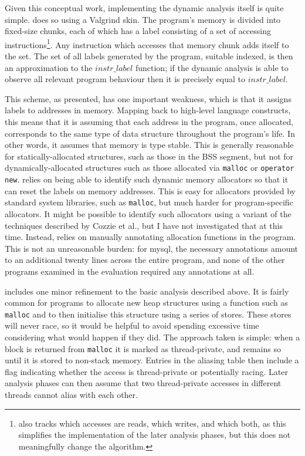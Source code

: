 Given this conceptual work, implementing the dynamic analysis itself
is quite simple.  {\Implementation} does so using a Valgrind skin.
The program's memory is divided into fixed-size chunks, each of which
has a label consisting of a set of accessing
instructions\footnote{{\Implementation} also tracks which accesses are
  reads, which writes, and which both, as this simplifies the
  implementation of the later analysis phases, but this does not
  meaningfully change the algorithm.}.  Any instruction which accesses
that memory chunk adds itself to the set.  The set of all labels
generated by the program, suitable indexed, is then an approximation
to the $\mathit{instr\_label}$ function; if the dynamic analysis is
able to observe all relevant program behaviour then it is precisely
equal to $\mathit{instr\_label}$.

This scheme, as presented, has one important weakness, which is that
it assigns labels to addresses in memory.  Mapping back to high-level
language constructs, this means that it is assuming that each address
in the program, once allocated, corresponds to the same type of data
structure throughout the program's life.  In other words, it assumes
that memory is type stable\cite{Greenwald1996}.  This is generally
reasonable for statically-allocated structures, such as those in the
BSS segment\cite[Section~7.6]{Stevens}, but not for
dynamically-allocated structures such as those allocated via
\texttt{malloc} or \texttt{operator new}.  {\Implementation} relies on
being able to identify such dynamic memory allocators so that it can
reset the labels on memory addresses.  This is easy for allocators
provided by standard system libraries, such as \texttt{malloc}, but
much harder for program-specific allocators.  It might be possible to
identify such allocators using a variant of the techniques described
by Cozzie et al.\cite{Cozzie2008}, but I have not investigated that at
this time.  Instead, {\implementation} relies on manually annotating
allocation functions in the program.  This is not an unreasonable
burden: for mysql, the necessary annotations amount to an additional
twenty lines across the entire program, and none of the other programs
examined in the evaluation required any annotations at all.

{\Implementation} includes one minor refinement to the basic analysis
described above.  It is fairly common for programs to allocate new
heap structures using a function such as \texttt{malloc} and to then
initialise this structure using a series of stores.  These stores will
never race, so it would be helpful to avoid spending excessive time
considering what would happen if they did.  The approach taken is
simple: when a block is returned from \texttt{malloc} it is marked as
thread-private, and remains so until it is stored to non-stack memory.
Entries in the aliasing table then include a flag indicating whether
the access is thread-private or potentially racing.  Later analysis
phases can then assume that two thread-private accesses in different
threads cannot alias with each other.

